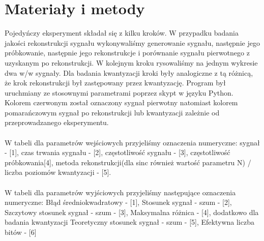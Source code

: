 \documentclass[12pt]{article}
\begin{document}
    \section{Materiały i metody} {
        Pojedyńczy eksperyment składał się z kilku kroków. W przypadku badania jakości
        rekonstrukcji sygnału wykonywaliśmy generowanie sygnału, następnie jego próbkowanie,
        następnie jego rekonstrukcje i porównanie sygnału pierwotnego z uzyskanym po rekonstrukcji.
        W kolejnym kroku rysowaliśmy na jednym wykresie dwa w/w sygnały. Dla badania kwantyzacji
        kroki były analogiczne z tą różnicą, że krok rekonstrukcji był zastępowany przez
        kwantyzację. Program był uruchmiany ze stosownymi parametrami poprzez skypt w języku
        Python. Kolorem czerwonym został oznaczony sygnał pierwotny natomiast kolorem pomarańczowym
        sygnał po rekonstrukcji lub kwantyzacji zależnie od przeprowadzanego eksperymentu.\\\\

        W tabeli dla parametrów wejściowych przyjeliśmy oznaczenia numeryczne: sygnał - [1],
        czas trwania sygnału - [2], częstotliwość sygnału - [3], częstotliwość próbkowania[4],
        metoda rekonstrukcji(dla sinc również wartość parametru N) / liczba poziomów kwantyzacji - [5]. \\\\

        W tabeli dla parametrów wyjściowych przyjeliśmy następujące oznaczenia numeryczne:
        Błąd średniokwadratowy - [1], Stosunek sygnał - szum - [2],
        Szczytowy stosunek sygnał - szum - [3], Maksymalna różnica - [4], dodatkowo dla badania kwantyzacji
        Teoretyczny stosunek sygnał - szum - [5], Efektywna liczba bitów - [6]
    }
    \newpage
\end{document}
